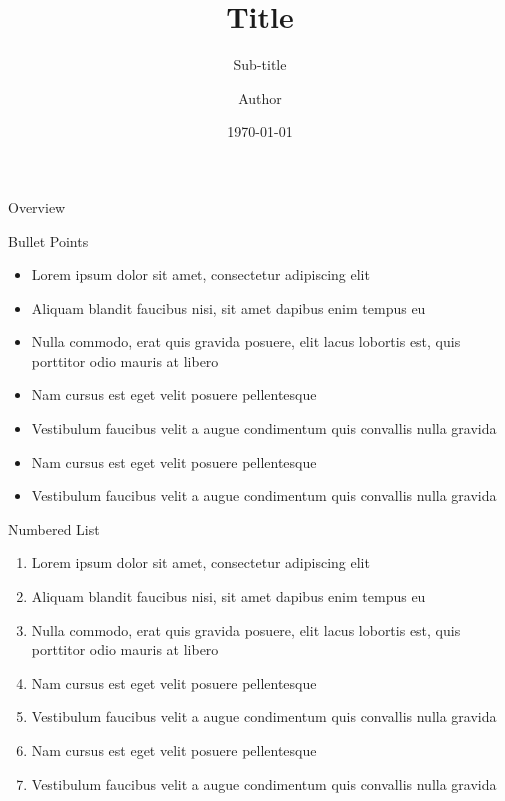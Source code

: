 \documentclass[aspectratio=169,xcolor=dvipsnames, t]{beamer}
\title[short title]{Title} %
\subtitle{Sub-title}
\author[sss]{Author}
\institute[HFUT Transportation]{School of Automotive and Transportation Engineering
\newline
Hefei University of Techonology
}
\date{\today} %
\begin{document}
\maketitlepage

\begin{frame}[t]{Overview}
    \tableofcontents
\end{frame}


\begin{frame}{Bullet Points}
    \begin{itemize}
        \item Lorem ipsum dolor sit amet, consectetur adipiscing elit
        \item Aliquam blandit faucibus nisi, sit amet dapibus enim tempus eu
        \item Nulla commodo, erat quis gravida posuere, elit lacus lobortis est, quis porttitor odio mauris at libero
        \item Nam cursus est eget velit posuere pellentesque
        \item Vestibulum faucibus velit a augue condimentum quis convallis nulla gravida
        \item Nam cursus est eget velit posuere pellentesque
        \item Vestibulum faucibus velit a augue condimentum quis convallis nulla gravida
    \end{itemize}
\end{frame}

\begin{frame}{Numbered List}
    \begin{enumerate}
        \item Lorem ipsum dolor sit amet, consectetur adipiscing elit
        \item Aliquam blandit faucibus nisi, sit amet dapibus enim tempus eu
        \item Nulla commodo, erat quis gravida posuere, elit lacus lobortis est, quis porttitor odio mauris at libero
        \item Nam cursus est eget velit posuere pellentesque
        \item Vestibulum faucibus velit a augue condimentum quis convallis nulla gravida
        \item Nam cursus est eget velit posuere pellentesque
        \item Vestibulum faucibus velit a augue condimentum quis convallis nulla gravida
    \end{enumerate}
\end{frame}
\end{document}
